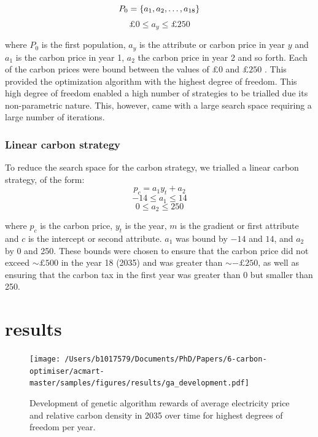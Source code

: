 \documentclass[sigconf]{acmart}
\begin{document}
\begin{equation}
\label{eq:eighteen_degrees_freedom}
	P_0=\{a_1,a_2,\ldots,a_{18}\}\\
\end{equation} 
\begin{equation*}
		\pounds 0\leq a_y\leq \pounds 250
\end{equation*}

\noindent where $P_0$ is the first population, $a_y$ is the attribute or carbon price in year $y$ and $a_1$ is the carbon price in year 1, $a_2$ the carbon price in year 2 and so forth. Each of the carbon prices were bound between the values of $\pounds0$ and  $\pounds250$ . This provided the optimization algorithm with the highest degree of freedom. This high degree of freedom enabled a high number of strategies to be trialled due its non-parametric nature. This, however, came with a large search space requiring a large number of iterations.


 \subsubsection{Linear carbon strategy}
 \label{sssec:linear_carbon_strategy}
 To reduce the search space for the carbon strategy, we trialled a linear carbon strategy, of the form:
 \begin{equation}
 	p_c=a_1y_t+a_2
 \end{equation}
 \begin{equation*}
 	-14 \leq a_1\leq 14
 \end{equation*}
  \begin{equation*}
 	0 \leq a_2\leq 250
 \end{equation*}
 
 \noindent where $p_c$ is the carbon price, $y_t$ is the year, $m$ is the gradient or first attribute and $c$ is the intercept or second attribute. $a_1$ was bound by $-14$ and $14$, and $a_2$ by 0 and 250. These bounds were chosen to ensure that the carbon price did not exceed ${\sim}\pounds 500$ in the year 18 (2035) and was greater than ${\sim}-\pounds250$, as well as ensuring that the carbon tax in the first year was greater than 0 but smaller than 250.

\section{results}
\label{sec:results}




\begin{figure}
\centering
\texttt{[image: /Users/b1017579/Documents/PhD/Papers/6-carbon-optimiser/acmart-master/samples/figures/results/ga\_development.pdf]}
\caption{Development of genetic algorithm rewards of average electricity price and relative carbon density in 2035 over time for highest degrees of freedom per year.}
\label{fig:forward_scenario_best_pdcs1}
\end{figure}
\end{document}
